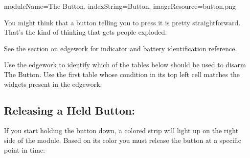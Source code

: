 \begin{module}{
  moduleName=The Button,
  indexString=Button,
  imageResource=button.png
}
{
  You might think that a button telling you to press it is pretty straightforward.
  That’s the kind of thinking that gets people exploded.

  See the section on edgework for indicator and battery identification reference.
}
  Use the edgework to identify which of the tables below should be used to disarm The Button.
  Use the first table whose condition in its top left cell matches the widgets present in the edgework.

  \subsection*{Releasing a Held Button:}
  If you start holding the button down, a colored strip will light up on the right side of the module.
  Based on its color you must release the button at a specific point in time:
\end{module}
